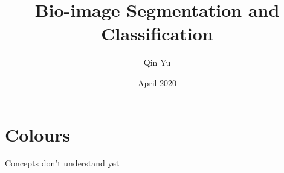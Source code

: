 \documentclass[a4paper,11pt]{article}
\title{Bio-image Segmentation and Classification}
\author{Qin Yu}
\date{April 2020}
\begin{document}
\maketitle
\tableofcontents

\section{Colours}
\begin{description}
    \item[Concepts don't understand yet] 
\end{description}






\printbibliography
\end{document}
